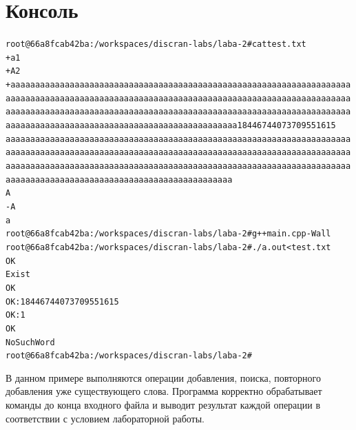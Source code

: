 \pagebreak

\section{Консоль}
\begin{alltt}
root@66a8fcab42ba:/workspaces/discran-labs/laba-2# cat test.txt
+ a 1
+ A 2
+ aaaaaaaaaaaaaaaaaaaaaaaaaaaaaaaaaaaaaaaaaaaaaaaaaaaaaaaaaaaaaaaaaaaaaaaaaaaaaaaaaaaaaaaaaaaaaaaaaaaaaaaaaaaaaaaaaaaaaaaaaaaaaaaaaaaaaaaaaaaaaaaaaaaaaaaaaaaaaaaaaaaaaaaaaaaaaaaaaaaaaaaaaaaaaaaaaaaaaaaaaaaaaaaaaaaaaaaaaaaaaaaaaaaaaaaaaaaaaaaaaaaaaaaaaaaaaaaa 18446744073709551615
aaaaaaaaaaaaaaaaaaaaaaaaaaaaaaaaaaaaaaaaaaaaaaaaaaaaaaaaaaaaaaaaaaaaaaaaaaaaaaaaaaaaaaaaaaaaaaaaaaaaaaaaaaaaaaaaaaaaaaaaaaaaaaaaaaaaaaaaaaaaaaaaaaaaaaaaaaaaaaaaaaaaaaaaaaaaaaaaaaaaaaaaaaaaaaaaaaaaaaaaaaaaaaaaaaaaaaaaaaaaaaaaaaaaaaaaaaaaaaaaaaaaaaaaaaaaaaaa
A
- A
a
root@66a8fcab42ba:/workspaces/discran-labs/laba-2# g++ main.cpp -Wall
root@66a8fcab42ba:/workspaces/discran-labs/laba-2# ./a.out < test.txt
OK
Exist
OK
OK: 18446744073709551615
OK: 1
OK
NoSuchWord
root@66a8fcab42ba:/workspaces/discran-labs/laba-2# 
\end{alltt}

В данном примере выполняются операции добавления, поиска, повторного добавления уже существующего слова. Программа корректно обрабатывает команды до конца входного файла и выводит результат каждой операции в соответствии с условием лабораторной работы.
\pagebreak